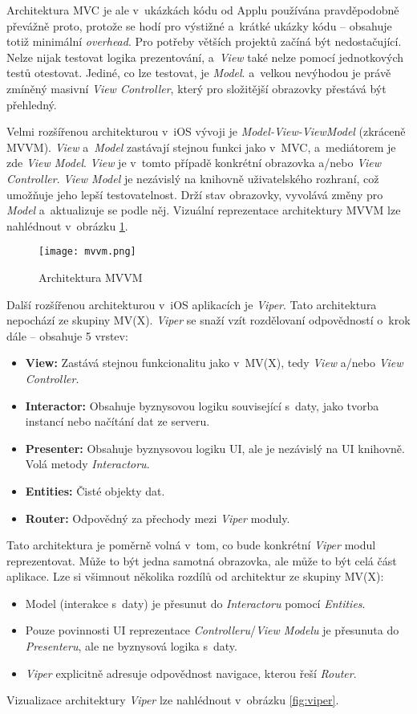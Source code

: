 Architektura MVC je ale v~ukázkách kódu od Applu používána pravděpodobně převážně proto, protože se hodí pro výstižné a~krátké ukázky kódu – obsahuje totiž minimální \emph{overhead}. Pro potřeby větších projektů začíná být nedostačující. Nelze nijak testovat logika prezentování, a~\emph{View} také nelze pomocí jednotkových testů otestovat. Jediné, co lze testovat, je \emph{Model}. a~velkou nevýhodou je právě zmíněný masivní \emph{View Controller}, který pro složitější obrazovky přestává být přehledný.

Velmi rozšířenou architekturou v~iOS vývoji je \emph{Model-View-ViewModel} (zkráceně MVVM). \emph{View} a~\emph{Model} zastávají stejnou funkci jako v~MVC, a~mediátorem je zde \emph{View Model}. \emph{View} je v~tomto případě konkrétní obrazovka a/nebo \emph{View Controller}. \emph{View Model} je nezávislý na knihovně uživatelského rozhraní, což umožňuje jeho lepší testovatelnost. Drží stav obrazovky, vyvolává změny pro \emph{Model} a~aktualizuje se podle něj. Vizuální reprezentace architektury MVVM lze nahlédnout v~obrázku \ref{fig:mvvm}.

\begin{figure}[h]
	\centering
	\texttt{[image: mvvm.png]}
	\caption{Architektura MVVM \cite{ios-architecture-patterns}}
	\label{fig:mvvm}
\end{figure}

Další rozšířenou architekturou v~iOS aplikacích je \emph{Viper}. Tato architektura nepochází ze skupiny MV(X). \emph{Viper} se snaží vzít rozdělovaní odpovědností o~krok dále – obsahuje 5 vrstev:
\begin{itemize}
\item\textbf{View:} Zastává stejnou funkcionalitu jako v~MV(X), tedy \emph{View} a/nebo \emph{View Controller}.
\item\textbf{Interactor:} Obsahuje byznysovou logiku související s~daty, jako tvorba instancí nebo načítání dat ze serveru.
\item\textbf{Presenter:} Obsahuje byznysovou logiku UI, ale je nezávislý na UI knihovně. Volá metody \emph{Interactoru}.
\item\textbf{Entities:} Čisté objekty dat.
\item\textbf{Router:} Odpovědný za přechody mezi \emph{Viper} moduly.
\end{itemize}
Tato architektura je poměrně volná v~tom, co bude konkrétní \emph{Viper} modul reprezentovat. Může to být jedna samotná obrazovka, ale může to být celá část aplikace. Lze si všimnout několika rozdílů od architektur ze skupiny MV(X):
\begin{itemize}
\item Model (interakce s~daty) je přesunut do \emph{Interactoru} pomocí \emph{Entities}.
\item Pouze povinnosti UI reprezentace \emph{Controlleru}/\emph{View Modelu} je přesunuta do \emph{Presenteru}, ale ne byznysová logika s~daty.
\item \emph{Viper} explicitně adresuje odpovědnost navigace, kterou řeší \emph{Router}.
\end{itemize}
Vizualizace architektury \emph{Viper} lze nahlédnout v~obrázku \ref{fig:viper}. \cite{ios-architecture-patterns}

